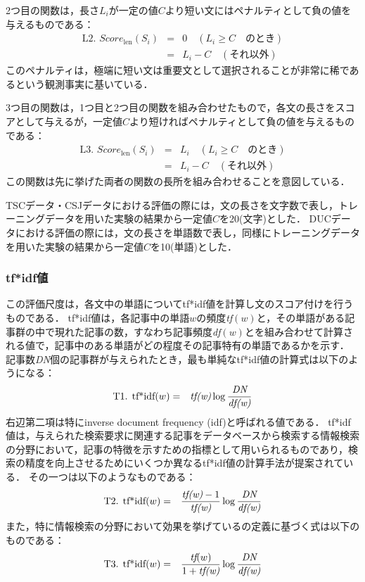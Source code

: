 2つ目の関数は，長さ\(L_i\)が一定の値\(C\)より短い文にはペナルティとして負の値を与えるものである： 
\begin{eqnarray*}
\mbox{L2. }
 Score_{\mbox{len}}(S_i) & = & 0 \quad (L_i \ge C \quad のとき) \\[-1mm]
            & = & L_i - C \quad (\mbox{それ以外}) \nonumber
\end{eqnarray*}
このペナルティは，極端に短い文は重要文として選択されることが非常に稀であるという観測事実に基いている．

3つ目の関数は，1つ目と2つ目の関数を組み合わせたもので，各文の長さをスコアとして与えるが，一定値\(C\)より短ければペナルティとして負の値を与えるものである：
\begin{eqnarray*}
\mbox{L3. }
 Score_{\mbox{len}}(S_i) & = & L_i \quad (L_i \ge C \quad のとき) \\[-1mm]
            & = & L_i - C \quad (\mbox{それ以外}) \nonumber
\end{eqnarray*}
この関数は先に挙げた両者の関数の長所を組み合わせることを意図している．

TSCデータ・CSJデータにおける評価の際には，文の長さを文字数で表し，トレーニングデータを用いた実験の結果から一定値\(C\)を20(文字)とした．
DUCデータにおける評価の際には，文の長さを単語数で表し，同様にトレーニングデータを用いた実験の結果から一定値\(C\)を10(単語)とした．

\subsubsection{tf*idf値}
\label{section:system_tfidf}

この評価尺度は，各文中の単語についてtf*idf値を計算し文のスコア付けを行うものである．
tf*idf値は，各記事中の単語\(w\)の頻度{\it tf}\((w)\)と，その単語がある記事群の中で現れた記事の数，すなわち記事頻度{\it df}\((w)\)とを組み合わせて計算される値で，記事中のある単語がどの程度その記事特有の単語であるかを示す．
記事数{\it DN}個の記事群が与えられたとき，最も単純なtf*idf値の計算式は以下のようになる：
\begin{eqnarray*}
\mbox{T1.  } \mbox{tf*idf}(w) & = & \mbox{\it tf(w)}  \log \frac{\mbox{\it DN}}{\mbox{\it df(w)}} \\
\end{eqnarray*}
右辺第二項は特にinverse document frequency (idf)と呼ばれる値である．
tf*idf値は，与えられた検索要求に関連する記事をデータベースから検索する情報検索の分野において，記事の特徴を示すための指標として用いられるものであり，検索の精度を向上させるためにいくつか異なるtf*idf値の計算手法が提案されている．
その一つは以下のようなものである：
\begin{eqnarray*}
\mbox{T2.  } \mbox{tf*idf}(w) & = & \frac{\mbox{{\it tf(w)}}-1}{\mbox{\it tf(w)}}  \log \frac{\mbox{\it DN}}{\mbox{\it df(w)}} \\
\end{eqnarray*}
また，特に情報検索の分野において効果を挙げている\cite{2poisson}の定義に基づく式は以下のものである：
\begin{eqnarray*}
\mbox{T3.  } \mbox{tf*idf}(w) & = & \frac{\mbox{\it tf}(w)}{1+\mbox{\it tf(w)}}  \log \frac{\mbox{\it DN}}{\mbox{\it df(w)}}
\end{eqnarray*}

